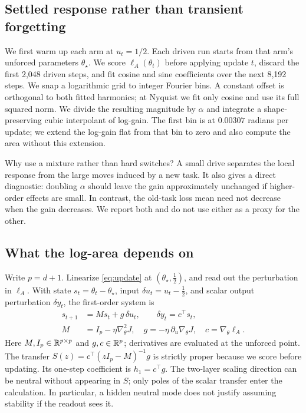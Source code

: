 \subsection{Settled response rather than transient forgetting}

We first warm up each arm at \(u_t=1/2\). Each driven run starts from that arm's unforced parameters \(\theta_\star\). We score \(\ell_A(\theta_t)\) before applying update \(t\), discard the first 2,048 driven steps, and fit cosine and sine coefficients over the next 8,192 steps. We snap a logarithmic grid to integer Fourier bins. A constant offset is orthogonal to both fitted harmonics; at Nyquist we fit only cosine and use its full squared norm. We divide the resulting magnitude by \(\alpha\) and integrate a shape-preserving cubic interpolant of log-gain. The first bin is at \(0.00307\) radians per update; we extend the log-gain flat from that bin to zero and also compute the area without this extension.

Why use a mixture rather than hard switches? A small drive separates the local response from the large moves induced by a new task. It also gives a direct diagnostic: doubling \(\alpha\) should leave the gain approximately unchanged if higher-order effects are small. In contrast, the old-task loss mean need not decrease when the gain decreases. We report both and do not use either as a proxy for the other.

\subsection{What the log-area depends on}

Write \(p=d+1\). Linearize \cref{eq:update} at \((\theta_\star,\tfrac12)\), and read out the perturbation in \(\ell_A\). With state \(s_t=\theta_t-\theta_\star\), input \(\delta u_t=u_t-\tfrac12\), and scalar output perturbation \(\delta y_t\), the first-order system is
\begin{align}
  s_{t+1}&=M s_t+g\,\delta u_t,\qquad \delta y_t=c^\top s_t,\label{eq:lti}\\
  M&=I_p-\eta\nabla_\theta^2 J,\quad
  g=-\eta\,\partial_u\nabla_\theta J,\quad c=\nabla_\theta\ell_A.
\end{align}
Here \(M,I_p\in\mathbb{R}^{p\times p}\) and \(g,c\in\mathbb{R}^p\); derivatives are evaluated at the unforced point. The transfer \(S(z)=c^\top(zI_p-M)^{-1}g\) is strictly proper because we score before updating. Its one-step coefficient is \(h_1=c^\top g\). The two-layer scaling direction can be neutral without appearing in \(S\); only poles of the scalar transfer enter the calculation. In particular, a hidden neutral mode does not justify assuming stability if the readout sees it.

